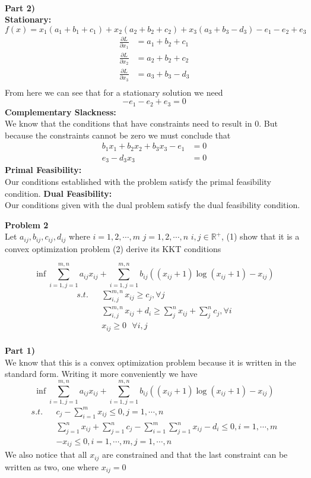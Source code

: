 \documentclass[12pt,letter]{article}
\newcommand{\problem}[1]{\vspace{3mm}\Large\textbf{{Problem {#1}\vspace{3mm}}}\normalsize\\}
\newcommand{\ppart}[1]{\vspace{2mm}\large\textbf{\\Part {#1})\vspace{2mm}}\normalsize\\}
\newcommand{\condition}[1]{\vspace{1mm}\textbf{{#1}:}\normalsize\\}
\begin{document}
\ppart{2}
\condition{Stationary}
\vspace{-0.2cm}
\[
    f(x) = x_1(a_1+b_1+c_1) + x_2(a_2+b_2+c_2) + x_3(a_3+b_3-d_3)-e_1-e_2+e_3
\]
\begin{align*}
    \frac{\partial L}{\partial x_1} &= a_1 + b_2 + c_1\\ 
    \frac{\partial L}{\partial x_2} &= a_2 + b_2 + c_2\\ 
    \frac{\partial L}{\partial x_3} &= a_3 + b_3 - d_3\\ 
\end{align*}
\vspace{-0.2cm}
From here we can see that for a stationary solution we need 
\[
    -e_1 - e_2 + e_3 = 0
\]
\condition{Complementary Slackness}
We know that the conditions that have constraints need to result in 0. But because
the constraints cannot be zero we must conclude that
\begin{align*}
    b_1x_1 + b_2x_2 + b_3x_3 - e_1 &= 0 \\
    e_3 - d_3x_3 &= 0
\end{align*}
\condition{Primal Feasibility}
Our conditions established with the problem satisfy the primal feasibility condition.
\condition{Dual Feasibility}
Our conditions given with the dual problem satisfy the dual feasibility condition.

\problem{2}
Let $a_{ij},b_{ij},c_{ij},d_{ij}$ where $i=1,2,\cdots,m$ $j=1,2,\cdots,n$ 
$i,j\in\mathbb{R^{+}}$, (1) show that it is a convex optimization problem
(2) derive its KKT conditions

\[
    \inf\sum\limits_{i=1,j=1}^{m,n}a_{ij}x_{ij} 
        + \sum\limits_{i=1,j=1}^{m,n}b_{ij}((x_{ij} + 1)\log(x_{ij} + 1) - x_{ij})
\]
\vspace{-0.7cm}
\begin{align*}
    s.t. && \sum\limits_{i,j}^{m,n} x_{ij} \geq c_j, \forall j\\
         && \sum\limits_{i,j}^{m,n} x_{ij} + d_i \geq \sum\limits_j^n x_{ij} 
            + \sum\limits_j^nc_j, \forall i\\
         && x_{ij} \geq 0\textsf{ } \forall i,j
\end{align*}
\ppart{1}
We know that this is a convex optimization problem because it is written in the 
standard form. Writing it more conveniently we have
\[
    \inf\sum\limits_{i=1,j=1}^{m,n}a_{ij}x_{ij} 
        + \sum\limits_{i=1,j=1}^{m,n}b_{ij}((x_{ij} + 1)\log(x_{ij} + 1) - x_{ij})
\]
\vspace{-0.7cm}
\begin{align*}
    s.t. && c_j - \sum\limits_{i=1}^mx_{ij} \leq 0, j=1,\cdots,n\\
         && \sum\limits_{j=1}^n x_{ij} + \sum\limits_{j=1}^n c_j
            - \sum\limits_{i=1}^m\sum\limits_{j=1}^n x_{ij} - d_i \leq 0 
            ,i=1,\cdots,m\\
         && -x_{ij} \leq 0, i=1,\cdots,m, j=1,\cdots,n
\end{align*}
We also notice that all $x_{ij}$ are constrained and that the last constraint
can be written as two, one where $x_{ij} = 0$
\end{document}
